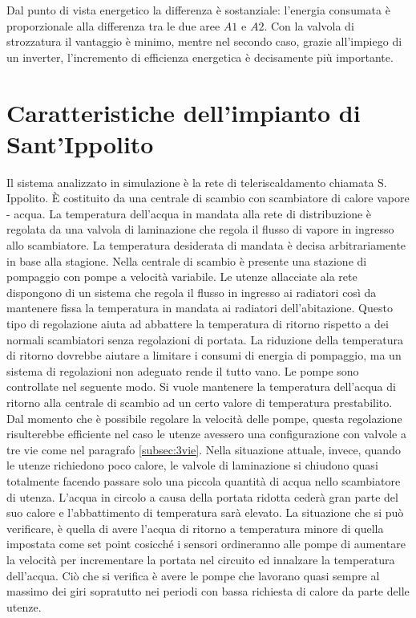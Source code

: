 \documentclass[laurea,oneside,11pt]{USiena_tesiLM3}
\begin{document}
Dal punto di vista energetico la differenza è sostanziale: l'energia consumata è proporzionale alla differenza tra le due aree $A1$ e $A2$. Con la valvola di strozzatura il vantaggio è minimo, mentre nel secondo caso, grazie all'impiego di un inverter, l'incremento di efficienza energetica è decisamente più importante.


\section{Caratteristiche dell'impianto di Sant'Ippolito}
Il sistema analizzato in simulazione è la rete di teleriscaldamento chiamata S. Ippolito. \`E costituito da una centrale di scambio con scambiatore di calore vapore - acqua. La temperatura dell'acqua in mandata alla rete di distribuzione è regolata da una valvola di laminazione che regola il flusso di vapore in ingresso allo scambiatore. La temperatura desiderata di mandata è decisa arbitrariamente in base alla stagione. Nella centrale di scambio è presente una stazione di pompaggio con pompe a velocità variabile.
Le utenze allacciate ala rete dispongono di un sistema che regola il flusso in ingresso ai radiatori così da mantenere fissa la temperatura in mandata ai radiatori dell'abitazione. Questo tipo di regolazione aiuta ad abbattere la temperatura di ritorno rispetto a dei normali  scambiatori senza regolazioni di portata. La riduzione della temperatura di ritorno dovrebbe aiutare a limitare i consumi di energia di pompaggio, ma un sistema di regolazioni non adeguato rende il tutto vano. Le pompe sono controllate nel seguente modo. Si vuole mantenere la temperatura dell'acqua di ritorno alla centrale di scambio ad un certo valore di temperatura prestabilito. Dal momento che è possibile regolare la velocità delle pompe, questa regolazione   risulterebbe efficiente nel caso le utenze avessero una configurazione con valvole a tre vie come nel paragrafo \ref{subsec:3vie}. Nella situazione attuale, invece, quando le utenze richiedono poco calore, le valvole di laminazione si chiudono quasi totalmente facendo passare solo una piccola quantità di acqua nello scambiatore di utenza. L'acqua in circolo a causa della portata ridotta cederà gran parte del suo calore e l'abbattimento di temperatura sarà elevato. La situazione che si può verificare, è quella di avere l'acqua di ritorno a temperatura minore di quella impostata come set point cosicché i sensori ordineranno alle pompe di aumentare la velocità per incrementare la portata  nel circuito ed innalzare la temperatura dell'acqua. Ciò che si verifica è avere le pompe che lavorano quasi sempre al massimo dei giri sopratutto nei periodi con bassa richiesta di calore da parte delle utenze.
\end{document}
